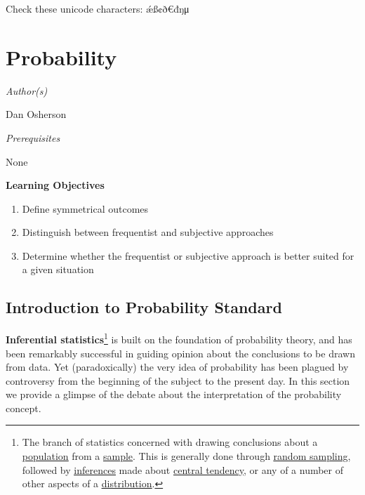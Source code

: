 \documentclass{book}
\begin{document}
Check these unicode characters: ǽß¢ð€đŋμ

\hypertarget{probability}{%
\chapter{Probability}\label{probability}}

\emph{Author(s)}

Dan Osherson

\emph{Prerequisites}

None

\textbf{Learning Objectives}

\begin{enumerate}
\def\labelenumi{\arabic{enumi}.}
\item
  Define symmetrical outcomes
\item
  Distinguish between frequentist and subjective approaches
\item
  Determine whether the frequentist or subjective approach is better suited
  for a given situation
\end{enumerate}

\hypertarget{introduction-to-probability-standard}{%
\section{Introduction to Probability
Standard}\label{introduction-to-probability-standard}}

\textbf{Inferential statistics}\footnote{The branch of statistics concerned
  with drawing conclusions about a
  \href{https://onlinestatbook.com/2/glossary/population.html}{\underline{population}}
  from a
  \href{https://onlinestatbook.com/2/glossary/sample.html}{\underline{sample}}.
  This is generally done through
  \href{https://onlinestatbook.com/2/glossary/random_sampling.html}{\underline{random
  sampling}}, followed by
  \href{https://onlinestatbook.com/2/glossary/inference.html}{\underline{inferences}}
  made about
  \href{https://onlinestatbook.com/2/glossary/center(distribution).html}{\underline{central
  tendency}}, or any of a number of other aspects of a
  \href{https://onlinestatbook.com/2/glossary/distribution.html}{\underline{distribution}}.}
is built on the foundation of probability theory, and has been remarkably
successful in guiding opinion about the conclusions to be drawn from data. Yet
(paradoxically) the very idea of probability has been plagued by controversy
from the beginning of the subject to the present day. In this section we
provide a glimpse of the debate about the interpretation of the probability
concept.
\end{document}
